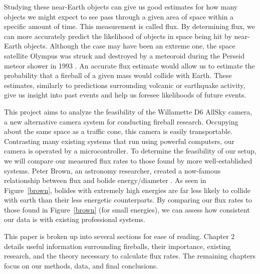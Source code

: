 Studying these near-Earth objects can give us good estimates for how many objects we might expect to see pass through a given area of space within a specific amount of time.
This measurement is called flux.
By determining flux, we can more accurately predict the likelihood of objects in space being hit by near-Earth objects. 
Although the case may have been an extreme one, the space satellite Olympus was struck and destroyed by a meteoroid during the Perseid meteor shower in 1993 \cite{bobrowsky_comet/asteroid_nodate}.
An accurate flux estimate would allow us to estimate the probability that a fireball of a given mass would collide with Earth.
These estimates, similarly to predictions surrounding volcanic or earthquake activity, give us insight into past events and help us foresee likelihoods of future events.

This project aims to analyze the feasibility of the Willamette D6 AllSky camera, a new alternative camera system for conducting fireball research. 
Occupying about the same space as a traffic cone, this camera is easily transportable.
Contrasting many existing systems that run using powerful computers, our camera is operated by a microcontroller.
To determine the feasibility of our setup, we will compare our measured flux rates to those found by more well-established systems.
Peter Brown, an astronomy researcher, created a now-famous relationship between flux and bolide energy/diameter \cite{brown_p_flux_2002}.
As seen in Figure~\ref{brown}, bolides with extremely high energies are far less likely to collide with earth than their less energetic counterparts.
By comparing our flux rates to those found in Figure~\ref{brown} (for small energies), we can assess how consistent our data is with existing professional systems.

This paper is broken up into several sections for ease of reading. Chapter 2 details useful information surrounding fireballs, their importance, existing research, and the theory necessary to calculate flux rates. 
The remaining chapters focus on our methods, data, and final conclusions.   
